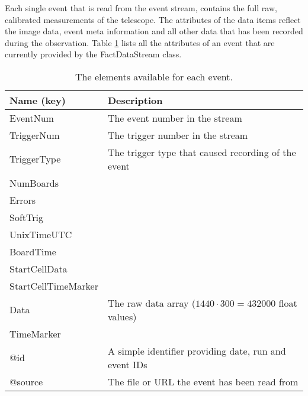 \documentclass[german,a4,11pt]{scrartcl}
\begin{document}
Each single event that is read from the event stream, contains the
full raw, calibrated measurements of the telescope. 
The attributes of the data items reflect the image data, event
meta information and all other data that has been recorded during the
observation. Table \ref{tab:factEventKeys} lists all the attributes of
an event that are currently provided by the {\ttfamily FactDataStream}
class.
\begin{table}[h!]
\renewcommand{\arraystretch}{1.25}
{\footnotesize
  \begin{center}
    \begin{tabular}{l|l} \hline
      \textsf{\textbf{Name (key)}} & \textsf{\textbf{Description}} \\ \hline \hline
      {\ttfamily EventNum} & The event number in the stream \\ \hline
      {\ttfamily TriggerNum} & The trigger number in the stream \\ \hline
      {\ttfamily TriggerType} & The trigger type that caused recording of the event \\ \hline
      {\ttfamily NumBoards} & \\ \hline
      {\ttfamily Errors} & \\ \hline
      {\ttfamily SoftTrig} & \\ \hline
      {\ttfamily UnixTimeUTC} & \\ \hline
      {\ttfamily BoardTime} & \\ \hline
      {\ttfamily StartCellData} & \\ \hline
      {\ttfamily StartCellTimeMarker} & \\ \hline
      {\ttfamily Data} & The raw data array ($1440\cdot 300 = 432000$ float values) \\ \hline
      {\ttfamily TimeMarker} & \\ \hline
      {\ttfamily @id} & A simple identifier providing date, run and event IDs \\ \hline
      {\ttfamily @source} & The file or URL the event has been read from \\ \hline
    \end{tabular}
  \end{center}}
  \caption{\label{tab:factEventKeys} The elements available for each event.}
\end{table}
\end{document}
